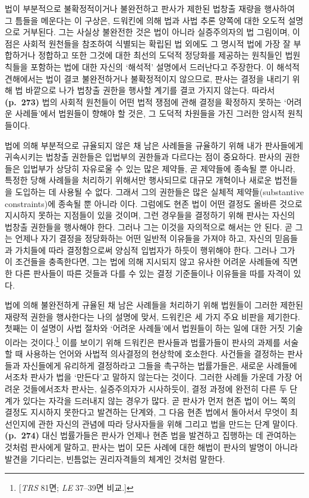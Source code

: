 법이 부분적으로 불확정적이거나 불완전하고 판사가 제한된 법창출 재량을
행사하여 그 틈들을 메운다는 이 구상은, 드워킨에 의해 법과 사법 추론
양쪽에 대한 오도적 설명으로 거부된다. 그는 사실상 불완전한 것은 법이
아니라 실증주의자의 법 그림이며, 이 점은 사회적 원천들을 참조하여
식별되는  확립된 법 외에도 그 명시적 법에 가장 잘
부합하거나 정합하고 또한 그것에 대한 최선의 도덕적 정당화를 제공하는
원칙들인  법원칙들을 포함하는 법에 대한 자신의 ‘해석적’
설명에서 드러난다고 주장한다. 이 해석적 견해에서는 법이 결코
불완전하거나 불확정적이지 않으므로, 판사는 결정을 내리기 위해 법
바깥으로 나가 법창출 권한을 행사할 계기를 결코 가지지 않는다. 따라서
\textbf{(p.~273)} 법의 사회적 원천들이 어떤 법적 쟁점에 관해 결정을
확정하지 못하는 ‘어려운 사례들’에서 법원들이 향해야 할 것은, 그 도덕적
차원들을 가진 그러한 암시적 원칙들이다.

법에 의해 부분적으로 규율되지 않은 채 남은 사례들을 규율하기 위해 내가
판사들에게 귀속시키는 법창출 권한들은 입법부의 권한들과 다르다는 점이
중요하다. 판사의 권한들은 입법부가 상당히 자유로울 수 있는 많은 제약들,
곧  제약들에 종속될 뿐 아니라, 특정한 당해
사례들을 처리하기 위해서만 행사되므로 대규모 개혁이나 새로운 법전들을
도입하는 데 사용될 수 없다. 그래서 그의 권한들은 많은 실체적
제약들(substantive constraints)에 종속될 뿐 아니라 이다.
그럼에도 현존 법이 어떤 결정도 올바른 것으로 지시하지 못하는 지점들이
있을 것이며, 그런 경우들을 결정하기 위해 판사는 자신의 법창출 권한들을
행사해야 한다. 그러나 그는 이것을 자의적으로 해서는 안 된다. 곧 그는
언제나 자기 결정을 정당화하는 어떤 일반적 이유들을 가져야 하고, 자신의
믿음들과 가치들에 따라 결정함으로써 양심적 입법자가 하듯이 행위해야
한다. 그러나 그가 이 조건들을 충족한다면, 그는 법에 의해 지시되지 않고
유사한 어려운 사례들에 직면한 다른 판사들이 따른 것들과 다를 수 있는
결정 기준들이나 이유들을 따를 자격이 있다.

법에 의해 불완전하게 규율된 채 남은 사례들을 처리하기 위해 법원들이
그러한 제한된 재량적 권한을 행사한다는 나의 설명에 맞서, 드워킨은 세
가지 주요 비판을 제기한다. 첫째는 이 설명이 사법 절차와 ‘어려운
사례들’에서 법원들이 하는 일에 대한 거짓 기술이라는 것이다.\footnote{{[}\emph{TRS}
  81면; \emph{LE} 37--39면 비교.{]}} 이를 보이기 위해 드워킨은 판사들과
법률가들이 판사의 과제를 서술할 때 사용하는 언어와 사법적 의사결정의
현상학에 호소한다. 사건들을 결정하는 판사들과 자신들에게 유리하게
결정하라고 그들을 촉구하는 법률가들은, 새로운 사례들에서조차 판사가 법을
‘만든다’고 말하지 않는다는 것이다. 그러한 사례들 가운데 가장 어려운
것들에서조차 판사는, 실증주의자가 시사하듯이, 결정 과정에 완전히 다른 두
단계가 있다는 자각을 드러내지 않는 경우가 많다. 곧 판사가 먼저 현존 법이
어느 쪽의 결정도 지시하지 못한다고 발견하는 단계와, 그 다음 현존 법에서
돌아서서 무엇이 최선인지에 관한 자신의 관념에 따라 당사자들을 위해
 그리고  법을 만드는 단계 말이다.
\textbf{(p.~274)} 대신 법률가들은 판사가 언제나 현존 법을 발견하고
집행하는 데 관여하는 것처럼 판사에게 말하고, 판사는 법이 모든 사례에
대한 해법이 판사의 발명이 아니라 발견을 기다리는, 빈틈없는 권리자격들의
체계인 것처럼 말한다.

